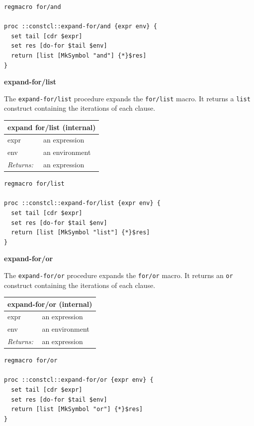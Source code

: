 \documentclass[twoside,9pt]{report}
\begin{document}
\noindent\makebox[\linewidth]{\rule{\linewidth}{0.4pt}}
\begin{lstlisting}
regmacro for/and
 
proc ::constcl::expand-for/and {expr env} {
  set tail [cdr $expr]
  set res [do-for $tail $env]
  return [list [MkSymbol "and"] {*}$res]
}
\end{lstlisting}
\noindent\makebox[\linewidth]{\rule{\linewidth}{0.4pt}}

\textbf{expand-for/list}


The \texttt{expand-for/list} procedure expands the \texttt{for/list} macro. It returns a \texttt{list} construct containing the iterations of each clause.

\begin{tabular}{ |l l| }
\hline
\multicolumn{2}{|l|}{expand for/list (internal)} \\
\hline
expr & an expression \\
env & an environment \\
\textit{Returns:} & an expression \\
\hline
\end{tabular}

\noindent\makebox[\linewidth]{\rule{\linewidth}{0.4pt}}
\begin{lstlisting}
regmacro for/list
 
proc ::constcl::expand-for/list {expr env} {
  set tail [cdr $expr]
  set res [do-for $tail $env]
  return [list [MkSymbol "list"] {*}$res]
}
\end{lstlisting}
\noindent\makebox[\linewidth]{\rule{\linewidth}{0.4pt}}

\textbf{expand-for/or}


The \texttt{expand-for/or} procedure expands the \texttt{for/or} macro. It returns an \texttt{or} construct containing the iterations of each clause.

\begin{tabular}{ |l l| }
\hline
\multicolumn{2}{|l|}{expand-for/or (internal)} \\
\hline
expr & an expression \\
env & an environment \\
\textit{Returns:} & an expression \\
\hline
\end{tabular}

\noindent\makebox[\linewidth]{\rule{\linewidth}{0.4pt}}
\begin{lstlisting}
regmacro for/or
 
proc ::constcl::expand-for/or {expr env} {
  set tail [cdr $expr]
  set res [do-for $tail $env]
  return [list [MkSymbol "or"] {*}$res]
}
\end{lstlisting}
\noindent\makebox[\linewidth]{\rule{\linewidth}{0.4pt}}
\end{document}
